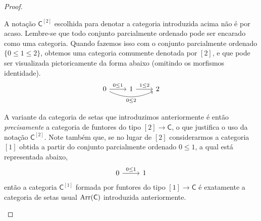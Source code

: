 \begin{proof}
  \begin{obs}
    A notação $\mathsf{C}^{[2]}$ escolhida para denotar a categoria introduzida acima não é por acaso.
    Lembre-se que todo conjunto parcialmente ordenado pode ser encarado como uma categoria.
    Quando fazemos isso com o conjunto parcialmente ordenado $\{0 \leq 1 \leq 2\}$, obtemos uma categoria comumente denotada por $[2]$, e que pode ser visualizada pictoricamente da forma abaixo (omitindo os morfismos identidade).
    \begin{displaymath}
      \begin{tikzcd}
        0
        \arrow[r, "0 \leq 1"]
        \arrow[rr, bend right=25, "0 \leq 2" swap]
        & 1
        \arrow[r, "1 \leq 2"]
        & 2      
      \end{tikzcd}
    \end{displaymath}
  
    A variante da categoria de setas que introduzimos anteriormente é então \emph{precisamente} a categoria de funtores do tipo $[2] \to \mathsf{C}$, o que justifica o uso da notação $\mathsf{C}^{[2]}$.
    Note também que, se no lugar de $[2]$ considerarmos a categoria $[1]$ obtida a partir do conjunto parcialmente ordenado $0 \leq 1$, a qual está representada abaixo,
    \begin{displaymath}
      \begin{tikzcd}
        0
        \arrow[r, "0 \leq 1"]
        & 1
      \end{tikzcd}
    \end{displaymath}
    então a categoria $\mathsf{C}^{[1]}$ formada por funtores do tipo $[1] \to \mathsf{C}$ é exatamente a categoria de setas usual $\mathrm{Arr}(\mathsf{C})$ introduzida anteriormente.
  \end{obs}
  

\end{proof}
